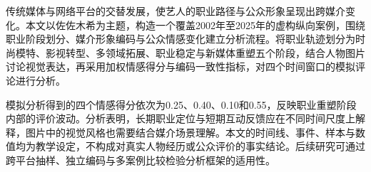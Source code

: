 传统媒体与网络平台的交替发展，使艺人的职业路径与公众形象呈现出跨媒介变化。本文以佐佐木希为主题，构造一个覆盖2002年至2025年的虚构纵向案例，围绕职业阶段划分、媒介形象编码与公众情感变化建立分析流程。将职业轨迹划分为时尚模特、影视转型、多领域拓展、职业稳定与新媒体重塑五个阶段，结合人物图片讨论视觉表达，再采用加权情感得分与编码一致性指标，对四个时间窗口的模拟评论进行分析。

模拟分析得到的四个情感得分依次为0.25、0.40、0.10和0.55，反映职业重塑阶段内部的评价波动。分析表明，长期职业定位与短期互动反馈应在不同时间尺度上解释，图片中的视觉风格也需要结合媒介场景理解。本文的时间线、事件、样本与数值均为教学设定，不构成对真实人物经历或公众评价的事实结论。后续研究可通过跨平台抽样、独立编码与多案例比较检验分析框架的适用性。
